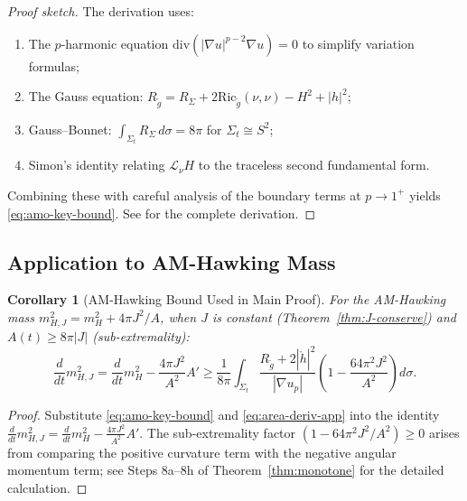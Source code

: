 \documentclass[12pt]{article}
\theoremstyle{plain}
\newtheorem{corollary}[theorem]{Corollary}
\theoremstyle{definition}
\theoremstyle{remark}
\newcommand{\Ric}{\mathrm{Ric}}
\newcommand{\Div}{\mathrm{div}}
\newcommand{\tg}{\tilde{g}}
\begin{document}
\begin{proof}[Proof sketch]
The derivation uses:
\begin{enumerate}
    \item The $p$-harmonic equation $\Div(|\nabla u|^{p-2}\nabla u) = 0$ to simplify variation formulas;
    \item The Gauss equation: $R_{\tg} = R_\Sigma + 2\Ric_{\tg}(\nu,\nu) - H^2 + |h|^2$;
    \item Gauss--Bonnet: $\int_{\Sigma_t} R_\Sigma\,d\sigma = 8\pi$ for $\Sigma_t \cong S^2$;
    \item Simon's identity relating $\mathcal{L}_\nu H$ to the traceless second fundamental form.
\end{enumerate}
Combining these with careful analysis of the boundary terms at $p \to 1^+$ yields \eqref{eq:amo-key-bound}. See \cite[Section~4]{amo2022} for the complete derivation.
\end{proof}

\subsection{Application to AM-Hawking Mass}

\begin{corollary}[AM-Hawking Bound Used in Main Proof]\label{cor:am-hawking-bound-app}
For the AM-Hawking mass $m_{H,J}^2 = m_H^2 + 4\pi J^2/A$, when $J$ is constant (Theorem~\ref{thm:J-conserve}) and $A(t) \geq 8\pi|J|$ (sub-extremality):
\begin{equation}\label{eq:am-hawking-bound-app}
\frac{d}{dt}m_{H,J}^2 = \frac{d}{dt}m_H^2 - \frac{4\pi J^2}{A^2}A' \geq \frac{1}{8\pi}\int_{\Sigma_t} \frac{R_{\tg} + 2|\mathring{h}|^2}{|\nabla u_p|}\left(1 - \frac{64\pi^2 J^2}{A^2}\right)d\sigma.
\end{equation}
\end{corollary}

\begin{proof}
Substitute \eqref{eq:amo-key-bound} and \eqref{eq:area-deriv-app} into the identity $\frac{d}{dt}m_{H,J}^2 = \frac{d}{dt}m_H^2 - \frac{4\pi J^2}{A^2}A'$. The sub-extremality factor $(1 - 64\pi^2 J^2/A^2) \geq 0$ arises from comparing the positive curvature term with the negative angular momentum term; see Steps 8a--8h of Theorem~\ref{thm:monotone} for the detailed calculation.
\end{proof}
\end{document}
